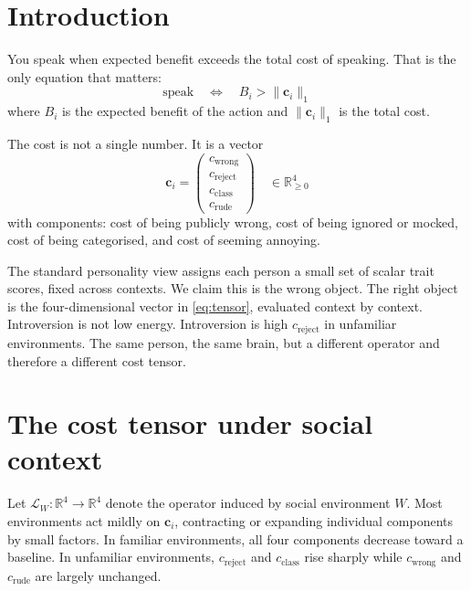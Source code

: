 \documentclass[12pt,a4paper]{article}
\begin{document}
\vspace{0.5cm}

\section{Introduction}
\label{sec:intro}

You speak when expected benefit exceeds the total cost of speaking. That is the only equation that matters:
\begin{equation}
  \text{speak} \quad \Longleftrightarrow \quad B_i > \|\mathbf{c}_i\|_1
  \label{eq:action}
\end{equation}
where $B_i$ is the expected benefit of the action and $\|\mathbf{c}_i\|_1$ is the total cost.

The cost is not a single number. It is a vector
\begin{equation}
  \mathbf{c}_i = \begin{pmatrix} c_{\mathrm{wrong}} \\ c_{\mathrm{reject}} \\ c_{\mathrm{class}} \\ c_{\mathrm{rude}} \end{pmatrix}
  \quad \in \mathbb{R}^4_{\geq 0}
  \label{eq:tensor}
\end{equation}
with components: cost of being publicly wrong, cost of being ignored or mocked, cost of being categorised, and cost of seeming annoying.

The standard personality view assigns each person a small set of scalar trait scores, fixed across contexts. We claim this is the wrong object. The right object is the four-dimensional vector in \eqref{eq:tensor}, evaluated context by context. Introversion is not low energy. Introversion is high $c_{\mathrm{reject}}$ in unfamiliar environments. The same person, the same brain, but a different operator and therefore a different cost tensor.

\section{The cost tensor under social context}
\label{sec:context}

Let $\mathcal{L}_W : \mathbb{R}^4 \to \mathbb{R}^4$ denote the operator induced by social environment $W$. Most environments act mildly on $\mathbf{c}_i$, contracting or expanding individual components by small factors. In familiar environments, all four components decrease toward a baseline. In unfamiliar environments, $c_{\mathrm{reject}}$ and $c_{\mathrm{class}}$ rise sharply while $c_{\mathrm{wrong}}$ and $c_{\mathrm{rude}}$ are largely unchanged.
\end{document}
